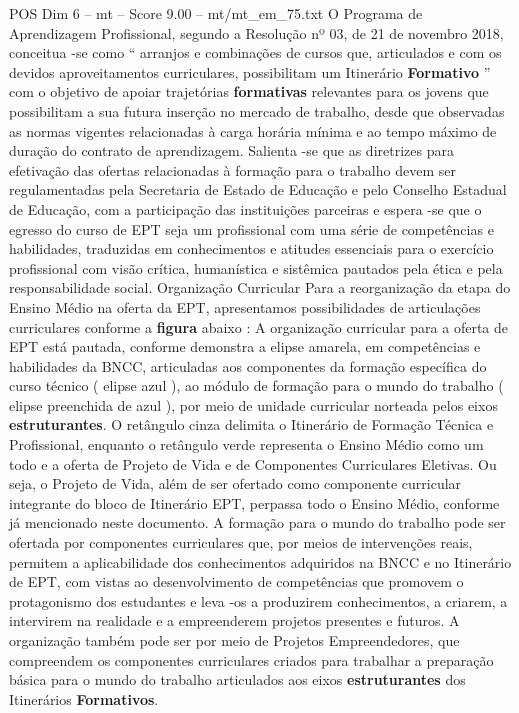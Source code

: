 \begin{textsample}{POS Dim 6 – mt – Score 9.00 – mt/mt\_em\_75.txt}
O Programa de Aprendizagem Profissional, segundo a Resolução nº 03, de 21 de novembro 2018, conceitua -se como “ arranjos e combinações de cursos que, articulados e com os devidos aproveitamentos curriculares, possibilitam um Itinerário \textbf{Formativo} ” com o objetivo de apoiar trajetórias \textbf{formativas} relevantes para os jovens que possibilitam a sua futura inserção no mercado de trabalho, desde que observadas as normas vigentes relacionadas à carga horária mínima e ao tempo máximo de duração do contrato de aprendizagem.
Salienta -se que as diretrizes para efetivação das ofertas relacionadas à formação para o trabalho devem ser regulamentadas pela Secretaria de Estado de Educação e pelo Conselho Estadual de Educação, com a participação das instituições parceiras e espera -se que o egresso do curso de EPT seja um profissional com uma série de competências e habilidades, traduzidas em conhecimentos e atitudes essenciais para o exercício profissional com visão crítica, humanística e sistêmica pautados pela ética e pela responsabilidade social.
Organização Curricular Para a reorganização da etapa do Ensino Médio na oferta da EPT, apresentamos possibilidades de articulações curriculares conforme a \textbf{figura} abaixo : A organização curricular para a oferta de EPT está pautada, conforme demonstra a elipse amarela, em competências e habilidades da BNCC, articuladas aos componentes da formação específica do curso técnico ( elipse azul ), ao módulo de formação para o mundo do trabalho ( elipse preenchida de azul ), por meio de unidade curricular norteada pelos eixos \textbf{estruturantes}.
O retângulo cinza delimita o Itinerário de Formação Técnica e Profissional, enquanto o retângulo verde representa o Ensino Médio como um todo e a oferta de Projeto de Vida e de Componentes Curriculares Eletivas.
Ou seja, o Projeto de Vida, além de ser ofertado como componente curricular integrante do bloco de Itinerário EPT, perpassa todo o Ensino Médio, conforme já mencionado neste documento.
A formação para o mundo do trabalho pode ser ofertada por componentes curriculares que, por meios de intervenções reais, permitem a aplicabilidade dos conhecimentos adquiridos na BNCC e no Itinerário de EPT, com vistas ao desenvolvimento de competências que promovem o protagonismo dos estudantes e leva -os a produzirem conhecimentos, a criarem, a intervirem na realidade e a empreenderem projetos presentes e futuros.
A organização também pode ser por meio de Projetos Empreendedores, que compreendem os componentes curriculares criados para trabalhar a preparação básica para o mundo do trabalho articulados aos eixos \textbf{estruturantes} dos Itinerários \textbf{Formativos}.

\end{textsample}
